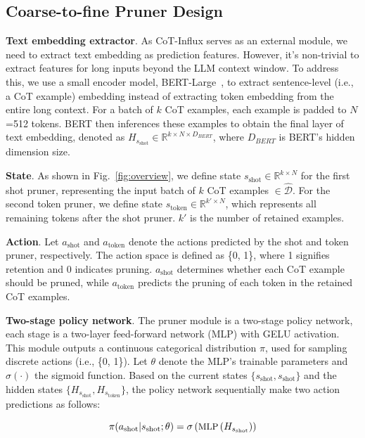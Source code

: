 \subsection{Coarse-to-fine Pruner Design}
\label{sec:prunerdesign}

\textbf{Text embedding extractor}. As {CoT-Influx} serves as an external module, we need to extract text embedding as prediction features. However, it's non-trivial to extract features for long inputs beyond the LLM context window. To address this, we use a small encoder model, BERT-Large~\cite{bert},  to extract sentence-level (i.e., a CoT example) embedding instead of extracting token embedding from the entire long context. For a batch of $k$ CoT examples, each example is padded to $N$=512 tokens. BERT then inferences these examples to obtain the final layer of text embedding, denoted as $H_{s_\text{shot}}\in\mathbb{R}^{k\times N\times D_{BERT}}$, where $D_{BERT}$ is BERT's hidden dimension size. 

\textbf{State}. As shown in Fig.~\ref{fig:overview}, we define state $s_\text{shot}\in\mathbb{R}^{k\times N}$ for the first shot pruner, representing the input batch of $k$ CoT examples $\in\hat{\mathcal{D}}$. For the second token pruner, we define state $s_\text{token}\in\mathbb{R}^{k'\times N}$, which represents all remaining tokens after the shot pruner. $k'$ is the number of retained examples.

\textbf{Action}. Let $a_\text{shot}$ and $a_\text{token}$ denote the actions predicted by the shot and token pruner, respectively. The action space is defined as  \{0, 1\}, where 1 signifies retention and 0 indicates pruning.  $a_\text{shot}$ determines whether each CoT example should be pruned, while $a_\text{token}$ predicts the pruning of each token in the retained CoT examples.

\textbf{Two-stage policy network}. The pruner module is a two-stage policy network, each stage is a two-layer feed-forward network (MLP) with GELU activation. This module outputs a continuous categorical distribution $\pi$,  used for sampling discrete actions (i.e., \{0, 1\}).  Let $\theta$ denote the MLP's trainable parameters and $\sigma(\cdot)$ the sigmoid function. Based on the current states $\{s_\text{shot}, s_\text{shot}\}$ and the hidden states $\{H_{s_\text{shot}}, H_{s_\text{token}}\}$, the policy network sequentially make two action predictions as follows:

\begin{equation} \label{eq:shot_policy}
	\small
\displaystyle \pi(a_\text{shot}|s_\text{shot};\theta) = \sigma\left( \text{MLP} \left( H_{s_\text{shot}}\right)\right)
\end{equation}

